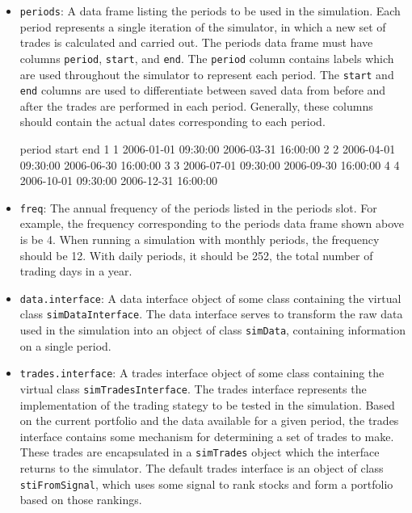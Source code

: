 \documentclass{article}
\begin{document}
\begin{itemize}

\item{\texttt{periods}}: A data frame listing the periods to be used
in the simulation.  Each period represents a single iteration of the
simulator, in which a new set of trades is calculated and carried out.
The periods data frame must have columns \texttt{period},
\texttt{start}, and \texttt{end}.  The \texttt{period} column contains
labels which are used throughout the simulator to represent each
period.  The \texttt{start} and \texttt{end} columns are used to
differentiate between saved data from before and after the trades are
performed in each period.  Generally, these columns should contain the
actual dates corresponding to each period.

\begin{Schunk}
\begin{Soutput}
  period               start                 end
1      1 2006-01-01 09:30:00 2006-03-31 16:00:00
2      2 2006-04-01 09:30:00 2006-06-30 16:00:00
3      3 2006-07-01 09:30:00 2006-09-30 16:00:00
4      4 2006-10-01 09:30:00 2006-12-31 16:00:00
\end{Soutput}
\end{Schunk}

\item{\texttt{freq}}: The annual frequency of the periods listed in
the periods slot.  For example, the frequency corresponding to the
periods data frame shown above is be 4.  When running a simulation
with monthly periods, the frequency should be 12.  With daily periods,
it should be 252, the total number of trading days in a year.

\item{\texttt{data.interface}}: A data interface object of some class
containing the virtual class \texttt{simDataInterface}.  The data
interface serves to transform the raw data used in the simulation into
an object of class \texttt{simData}, containing information on a
single period.

\item{\texttt{trades.interface}}: A trades interface object of some
class containing the virtual class \texttt{simTradesInterface}.  The
trades interface represents the implementation of the trading stategy
to be tested in the simulation.  Based on the current portfolio and
the data available for a given period, the trades interface contains
some mechanism for determining a set of trades to make.  These trades
are encapsulated in a \texttt{simTrades} object which the interface
returns to the simulator.  The default trades interface is an object
of class \texttt{stiFromSignal}, which uses some signal to rank stocks
and form a portfolio based on those rankings.


\end{itemize}
\end{document}
